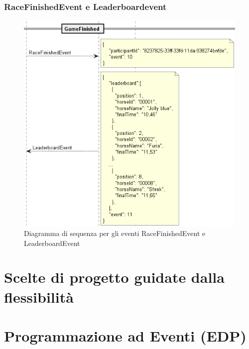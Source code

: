         \subsubsection{RaceFinishedEvent e Leaderboardevent}

        \begin{figure}[!ht]
            \centering
            \includegraphics[width=12cm]{figure/RaceFinishedEvent.png}
            \caption{Diagramma di sequenza per gli eventi RaceFinishedEvent e LeaderboardEvent}
        \end{figure}


\section{Scelte di progetto guidate dalla flessibilità}

\section{Programmazione ad Eventi (EDP)}